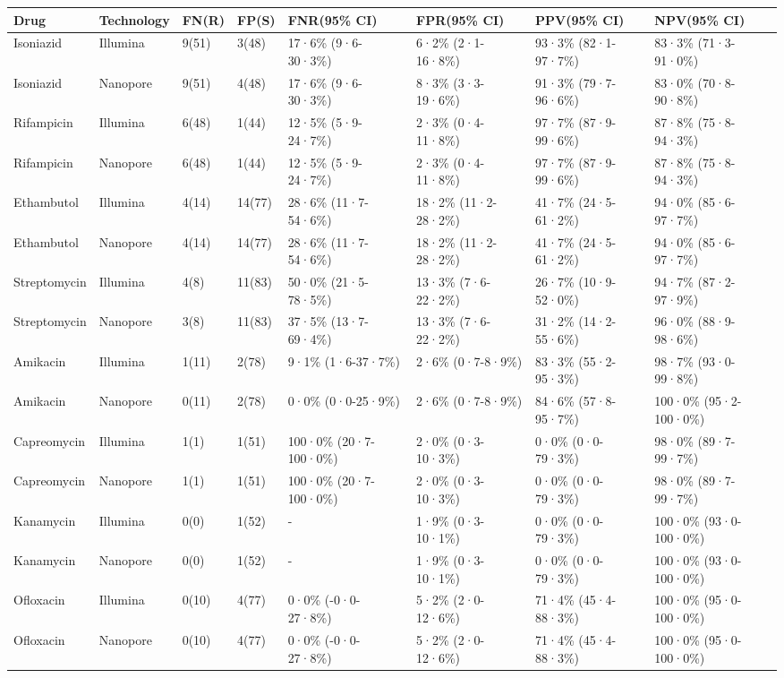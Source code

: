\begin{tabular}{llllllll}
\toprule
        Drug & Technology & FN(R) &  FP(S) &          FNR(95\% CI) &        FPR(95\% CI) &        PPV(95\% CI) &          NPV(95\% CI) \\
\midrule
   Isoniazid &   Illumina & 9(51) &  3(48) &    17·6\% (9·6-30·3\%) &   6·2\% (2·1-16·8\%) & 93·3\% (82·1-97·7\%) &   83·3\% (71·3-91·0\%) \\
   Isoniazid &   Nanopore & 9(51) &  4(48) &    17·6\% (9·6-30·3\%) &   8·3\% (3·3-19·6\%) & 91·3\% (79·7-96·6\%) &   83·0\% (70·8-90·8\%) \\
  Rifampicin &   Illumina & 6(48) &  1(44) &    12·5\% (5·9-24·7\%) &   2·3\% (0·4-11·8\%) & 97·7\% (87·9-99·6\%) &   87·8\% (75·8-94·3\%) \\
  Rifampicin &   Nanopore & 6(48) &  1(44) &    12·5\% (5·9-24·7\%) &   2·3\% (0·4-11·8\%) & 97·7\% (87·9-99·6\%) &   87·8\% (75·8-94·3\%) \\
  Ethambutol &   Illumina & 4(14) & 14(77) &   28·6\% (11·7-54·6\%) & 18·2\% (11·2-28·2\%) & 41·7\% (24·5-61·2\%) &   94·0\% (85·6-97·7\%) \\
  Ethambutol &   Nanopore & 4(14) & 14(77) &   28·6\% (11·7-54·6\%) & 18·2\% (11·2-28·2\%) & 41·7\% (24·5-61·2\%) &   94·0\% (85·6-97·7\%) \\
Streptomycin &   Illumina &  4(8) & 11(83) &   50·0\% (21·5-78·5\%) &  13·3\% (7·6-22·2\%) & 26·7\% (10·9-52·0\%) &   94·7\% (87·2-97·9\%) \\
Streptomycin &   Nanopore &  3(8) & 11(83) &   37·5\% (13·7-69·4\%) &  13·3\% (7·6-22·2\%) & 31·2\% (14·2-55·6\%) &   96·0\% (88·9-98·6\%) \\
    Amikacin &   Illumina & 1(11) &  2(78) &     9·1\% (1·6-37·7\%) &    2·6\% (0·7-8·9\%) & 83·3\% (55·2-95·3\%) &   98·7\% (93·0-99·8\%) \\
    Amikacin &   Nanopore & 0(11) &  2(78) &     0·0\% (0·0-25·9\%) &    2·6\% (0·7-8·9\%) & 84·6\% (57·8-95·7\%) & 100·0\% (95·2-100·0\%) \\
 Capreomycin &   Illumina &  1(1) &  1(51) & 100·0\% (20·7-100·0\%) &   2·0\% (0·3-10·3\%) &   0·0\% (0·0-79·3\%) &   98·0\% (89·7-99·7\%) \\
 Capreomycin &   Nanopore &  1(1) &  1(51) & 100·0\% (20·7-100·0\%) &   2·0\% (0·3-10·3\%) &   0·0\% (0·0-79·3\%) &   98·0\% (89·7-99·7\%) \\
   Kanamycin &   Illumina &  0(0) &  1(52) &                    - &   1·9\% (0·3-10·1\%) &   0·0\% (0·0-79·3\%) & 100·0\% (93·0-100·0\%) \\
   Kanamycin &   Nanopore &  0(0) &  1(52) &                    - &   1·9\% (0·3-10·1\%) &   0·0\% (0·0-79·3\%) & 100·0\% (93·0-100·0\%) \\
   Ofloxacin &   Illumina & 0(10) &  4(77) &    0·0\% (-0·0-27·8\%) &   5·2\% (2·0-12·6\%) & 71·4\% (45·4-88·3\%) & 100·0\% (95·0-100·0\%) \\
   Ofloxacin &   Nanopore & 0(10) &  4(77) &    0·0\% (-0·0-27·8\%) &   5·2\% (2·0-12·6\%) & 71·4\% (45·4-88·3\%) & 100·0\% (95·0-100·0\%) \\
\bottomrule
\end{tabular}

